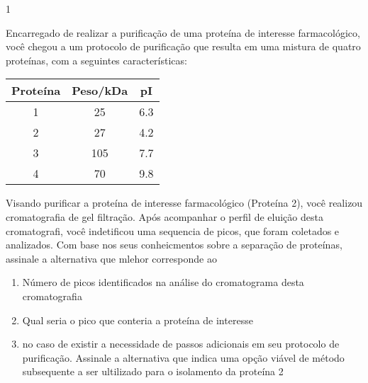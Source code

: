 \documentclass[\mainfilename]{subfiles}
\begin{document}
\begin{questionBox}1{}
    
    Encarregado de realizar a purificação de uma proteína de interesse farmacológico, você chegou a um protocolo de purificação que resulta em uma mistura de quatro proteínas, com a seguintes características:

    \begin{center}
        \begin{tabular}{c c c}
            
            \\\toprule
            
                \multicolumn{1}{c}{Proteína}
              & \multicolumn{1}{c}{Peso/\unit{\kilo\dalton}}
              & \multicolumn{1}{c}{pI}
            
            \\\midrule
            
                1 &  25 & 6.3
              \\2 &  27 & 4.2
              \\3 & 105 & 7.7
              \\4 &  70 & 9.8
            
            \\\bottomrule
            
        \end{tabular}
    \end{center}

    Visando purificar a proteína de interesse farmacológico (Proteína 2), você realizou cromatografia de gel filtração. Após acompanhar o perfil de eluição desta cromatografi, você indetificou uma sequencia de picos, que foram coletados e analizados. Com base nos seus conheicmentos sobre a separação de proteínas, assinale a alternativa que mlehor corresponde ao
    
    \begin{enumerate}[label=\roman*)]
        \item Número de picos identificados na análise do cromatograma desta cromatografia
        \item Qual seria o pico que conteria a proteína de interesse
        \item no caso de existir a necessidade de passos adicionais em seu protocolo de purificação. Assinale a alternativa que indica uma opção viável de método subsequente a ser ultilizado para o isolamento da proteína 2
    \end{enumerate}



\end{questionBox}
\end{document}
